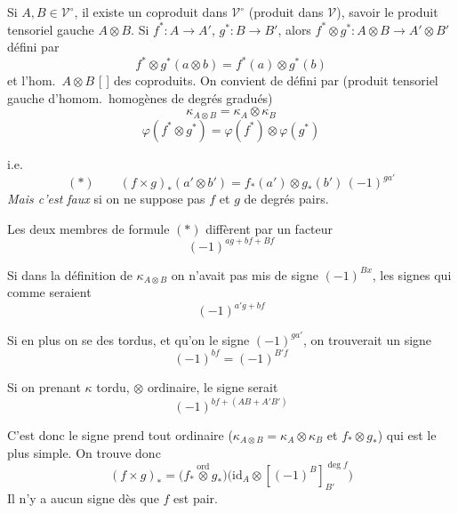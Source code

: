 \documentclass[11pt,a4paper]{article}
\begin{document}
Si $A, B \in \mathcal{V}^{\circ}$, il existe un coproduit dans
$\mathcal{V}^{\circ}$ (produit dans $\mathcal{V}$), savoir le produit
tensoriel gauche $A \otimes B$. Si $f^{*} : A \to A'$, $g^{*} : B \to B'$,
alors $f^{*} \otimes g^{*} : A \otimes B \to A' \otimes B'$ défini par
\[ f^{*} \otimes g^{*}(a \otimes b) = f^{*}(a) \otimes g^{*}(b) \]
et l'hom.\ $A \otimes B$ [ \ill{}] des coproduits.
\struck{\ill{}} On convient de \ill{} défini par (produit tensoriel gauche
d'homom.\ homogènes de degrés gradués)
\[ \kappa_{A \otimes B} = \kappa_{A} \otimes \kappa_{B} \]
\struck{\ill{}}
\[ \varphi(f^{*} \otimes g^{*}) = \varphi(f^{*}) \otimes \varphi(g^{*}) \]

i.e.
\[ (*) \qquad (f \times g)_{*}(a' \otimes b') = f_{*}(a') \otimes g_{*}(b')\,(-1)^{g a'} \]
\emph{Mais c'est \emph{faux}} si on ne suppose pas $f$ et $g$ de degrés pairs.

Les deux membres de formule $(*)$ diffèrent par un facteur
\[ (-1)^{ag + bf + Bf} \]

Si dans la définition de $\kappa_{A \otimes B}$ on n'avait pas mis de signe
$(-1)^{Bx}$, les signes qui  comme \ill{} seraient
\[ (-1)^{a'g + bf} \]

Si en plus on se  des  tordus, et qu'on
 \ill{} le signe $(-1)^{g a'}$, on trouverait un signe
\[ (-1)^{bf} = (-1)^{B'f} \]

Si on prenant $\kappa$ tordu, $\otimes$ ordinaire, le signe serait
\[ (-1)^{bf + (AB + A'B')} \]

C'est donc le signe \ill{} prend tout ordinaire
($\kappa_{A \otimes B} = \kappa_{A} \otimes \kappa_{B}$ et
$f_{*} \otimes g_{*}$) qui est le plus simple. On trouve donc
\[
\boxed{\ (f \times g)_{*} = \bigl(f_{*} \overset{\mathrm{ord}}{\otimes} g_{*}\bigr)\bigl(\mathrm{id}_{A} \otimes [(-1)^{B}]_{B'}^{\deg f}\bigr)\ }
\]
\struck{\ill{}} Il n'y a aucun signe dès que $f$ est pair.

\end{document}
